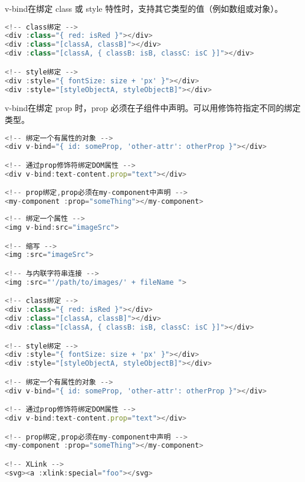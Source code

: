 \begin{compactitem}
\item v-bind在绑定 class 或 style 特性时，支持其它类型的值（例如数组或对象）。


\begin{lstlisting}[language=JavaScript]
<!-- class绑定 -->
<div :class="{ red: isRed }"></div>
<div :class="[classA, classB]"></div>
<div :class="[classA, { classB: isB, classC: isC }]"></div>

<!-- style绑定 -->
<div :style="{ fontSize: size + 'px' }"></div>
<div :style="[styleObjectA, styleObjectB]"></div>
\end{lstlisting}

\item v-bind在绑定 prop 时，prop 必须在子组件中声明。可以用修饰符指定不同的绑定类型。

\begin{lstlisting}[language=JavaScript]
<!-- 绑定一个有属性的对象 -->
<div v-bind="{ id: someProp, 'other-attr': otherProp }"></div>

<!-- 通过prop修饰符绑定DOM属性 -->
<div v-bind:text-content.prop="text"></div>

<!-- prop绑定,prop必须在my-component中声明 -->
<my-component :prop="someThing"></my-component>
\end{lstlisting}

\end{compactitem}



\begin{lstlisting}[language=JavaScript]
<!-- 绑定一个属性 -->
<img v-bind:src="imageSrc">

<!-- 缩写 -->
<img :src="imageSrc">

<!-- 与内联字符串连接 -->
<img :src="'/path/to/images/' + fileName ">

<!-- class绑定 -->
<div :class="{ red: isRed }"></div>
<div :class="[classA, classB]"></div>
<div :class="[classA, { classB: isB, classC: isC }]"></div>

<!-- style绑定 -->
<div :style="{ fontSize: size + 'px' }"></div>
<div :style="[styleObjectA, styleObjectB]"></div>

<!-- 绑定一个有属性的对象 -->
<div v-bind="{ id: someProp, 'other-attr': otherProp }"></div>

<!-- 通过prop修饰符绑定DOM属性 -->
<div v-bind:text-content.prop="text"></div>

<!-- prop绑定,prop必须在my-component中声明 -->
<my-component :prop="someThing"></my-component>

<!-- XLink -->
<svg><a :xlink:special="foo"></svg>
\end{lstlisting}

